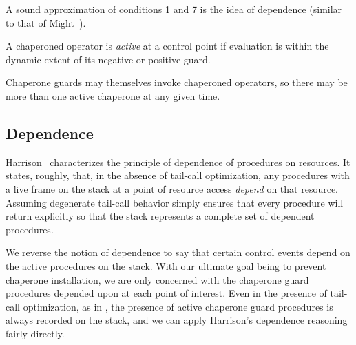 A sound approximation of conditions 1 and 7 is the idea of dependence (similar to that of Might~\cite{might2009interprocedural}).

\begin{definition}
A chaperoned operator is \emph{active} at a control point if evaluation is within the dynamic extent of its negative or positive guard.
\end{definition}

Chaperone guards may themselves invoke chaperoned operators, so there may be more than one active chaperone at any given time.

\subsection{Dependence}

Harrison~\cite{harrison1989interprocedural} characterizes the principle of dependence of procedures on resources.
It states, roughly, that, in the absence of tail-call optimization, any procedures with a live frame on the stack at a point of resource access \emph{depend} on that resource.
Assuming degenerate tail-call behavior simply ensures that every procedure will return explicitly so that the stack represents a complete set of dependent procedures.

We reverse the notion of dependence to say that certain control events depend on the active procedures on the stack.
With our ultimate goal being to prevent chaperone installation, we are only concerned with the chaperone guard procedures depended upon at each point of interest.
Even in the presence of tail-call optimization, as in \chapcalc, the presence of active chaperone guard procedures is always recorded on the stack, and we can apply Harrison's dependence reasoning fairly directly.


